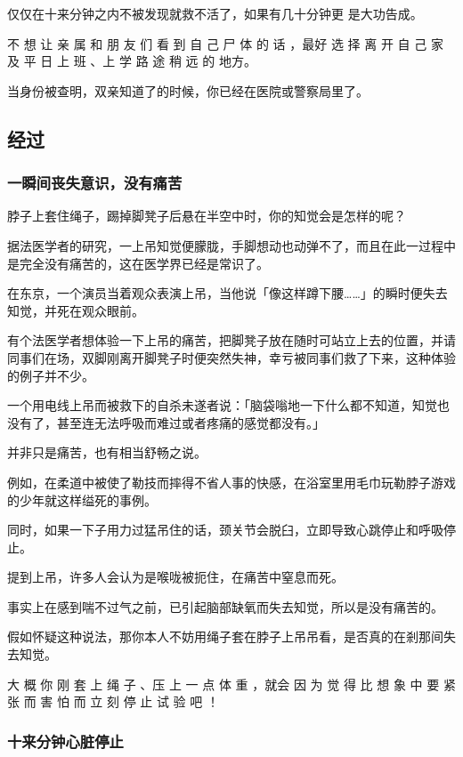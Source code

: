 \documentclass[UTF8]{ctexart}
\begin{document}
仅仅在十来分钟之内不被发现就救不活了，如果有几十分钟更 是大功告成。

不 想 让 亲 属 和 朋 友 们 看 到 自 己 尸 体 的 话 ，最好 选 择 离 开 自 己 家 及 平 日 上 班 、上 学 路 途 稍 远 的 地方。

当身份被查明，双亲知道了的时候，你已经在医院或警察局里了。

\subsection{经过}

\subsubsection*{一瞬间丧失意识，没有痛苦}

脖子上套住绳子，踢掉脚凳子后悬在半空中时，你的知觉会是怎样的呢？

据法医学者的研究，一上吊知觉便朦胧，手脚想动也动弹不了，而且在此一过程中是完全没有痛苦的，这在医学界已经是常识了。

在东京，一个演员当着观众表演上吊，当他说「像这样蹲下腰……」的瞬时便失去知觉，并死在观众眼前。

有个法医学者想体验一下上吊的痛苦，把脚凳子放在随时可站立上去的位置，并请同事们在场，双脚刚离开脚凳子时便突然失神，幸亏被同事们救了下来，这种体验的例子并不少。

一个用电线上吊而被救下的自杀未遂者说：「脑袋嗡地一下什么都不知道，知觉也没有了，甚至连无法呼吸而难过或者疼痛的感觉都没有。」

并非只是痛苦，也有相当舒畅之说。

例如，在柔道中被使了勒技而摔得不省人事的快感，在浴室里用毛巾玩勒脖子游戏的少年就这样缢死的事例。

同时，如果一下子用力过猛吊住的话，颈关节会脱臼，立即导致心跳停止和呼吸停止。

提到上吊，许多人会认为是喉咙被扼住，在痛苦中窒息而死。

事实上在感到喘不过气之前，已引起脑部缺氧而失去知觉，所以是没有痛苦的。

假如怀疑这种说法，那你本人不妨用绳子套在脖子上吊吊看，是否真的在剎那间失去知觉。

大 概 你 刚 套 上 绳 子 、压 上 一 点 体 重 ，就会 因 为 觉 得 比 想 象 中 要 紧 张 而 害 怕 而 立 刻 停 止 试 验 吧 ！ 

\subsubsection*{十来分钟心脏停止}
\end{document}
